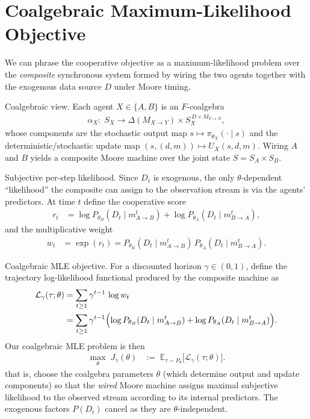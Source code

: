 \documentclass{article}
\theoremstyle{definition}
\begin{document}
\section{Coalgebraic Maximum-Likelihood Objective}

We can phrase the cooperative objective as a maximum-likelihood problem over the \emph{composite} synchronous system formed by wiring the two agents together with the exogenous data source $D$ under Moore timing.

Coalgebraic view. Each agent $X\in\{A,B\}$ is an $F$-coalgebra
\begin{align}
  \alpha_X:\; S_X \longrightarrow \Delta(M_{X\to Y}) \times S_X^{\,D\times M_{Y\to X}},
\end{align}
whose components are the stochastic output map $s\mapsto \pi_{\theta_X}(\cdot\mid s)$ and the deterministic/stochastic update map $(s,(d,m))\mapsto U_X(s,d,m)$. Wiring $A$ and $B$ yields a composite Moore machine over the joint state $S=S_A\times S_B$.

Subjective per-step likelihood. Since $D_t$ is exogenous, the only $\theta$-dependent “likelihood” the composite can assign to the observation stream is via the agents’ predictors. At time $t$ define the cooperative score
\begin{align}
  r_t &= \log P_{\theta_B}(D_t\mid m_{A\to B}^t) + \log P_{\theta_A}(D_t\mid m_{B\to A}^t),
\end{align}
and the multiplicative weight
\begin{align}
  w_t &= \exp(r_t) = P_{\theta_B}(D_t\mid m_{A\to B}^t)\,P_{\theta_A}(D_t\mid m_{B\to A}^t).
\end{align}

Coalgebraic MLE objective. For a discounted horizon $\gamma\in(0,1)$, define the trajectory log-likelihood functional produced by the composite machine as
\begin{align}
  \mathcal{L}_\gamma(\tau;\theta)
    &= \sum_{t\ge 1}\gamma^{t-1}\,\log w_t \\
    &= \sum_{t\ge 1}\gamma^{t-1}\Bigl(\log P_{\theta_B}(D_t\mid m_{A\to B}^t)+\log P_{\theta_A}(D_t\mid m_{B\to A}^t)\Bigr).
\end{align}
Our coalgebraic MLE problem is then
\begin{align}
  \max_{\theta}\; J_\gamma(\theta)
    &:=\;\mathbb{E}_{\tau\sim P_\theta}\bigl[\mathcal{L}_\gamma(\tau;\theta)\bigr].
\end{align}
that is, choose the coalgebra parameters $\theta$ (which determine output and update components) so that the \emph{wired} Moore machine assigns maximal subjective likelihood to the observed stream according to its internal predictors. The exogenous factors $P(D_t)$ cancel as they are $\theta$-independent.
\end{document}
